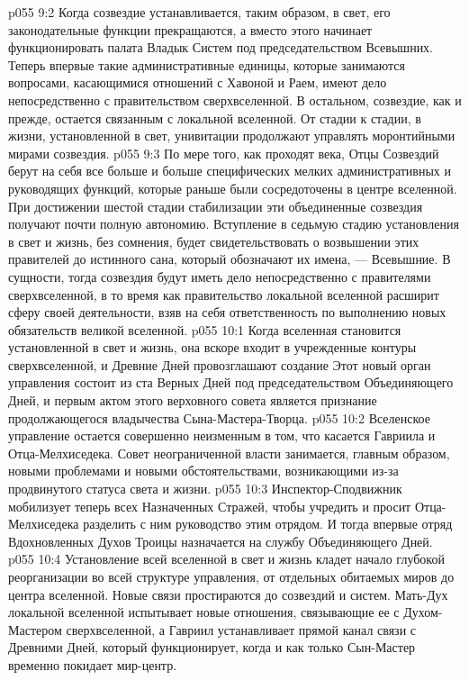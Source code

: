 \vs p055 9:2 Когда созвездие устанавливается, таким образом, в свет, его законодательные функции прекращаются, а вместо этого начинает функционировать палата Владык Систем под председательством Всевышних. Теперь впервые такие административные единицы, которые занимаются вопросами, касающимися отношений с Хавоной и Раем, имеют дело непосредственно с правительством сверхвселенной. В остальном, созвездие, как и прежде, остается связанным с локальной вселенной. От стадии к стадии, в жизни, установленной в свет, унивитации продолжают управлять моронтийными мирами созвездия.
\vs p055 9:3 По мере того, как проходят века, Отцы Созвездий берут на себя все больше и больше специфических мелких административных и руководящих функций, которые раньше были сосредоточены в центре вселенной. При достижении шестой стадии стабилизации эти объединенные созвездия получают почти полную автономию. Вступление в седьмую стадию установления в свет и жизнь, без сомнения, будет свидетельствовать о возвышении этих правителей до истинного сана, который обозначают их имена, --- Всевышние. В сущности, тогда созвездия будут иметь дело непосредственно с правителями сверхвселенной, в то время как правительство локальной вселенной расширит сферу своей деятельности, взяв на себя ответственность по выполнению новых обязательств великой вселенной.
\vs p055 10:1 Когда вселенная становится установленной в свет и жизнь, она вскоре входит в учрежденные контуры сверхвселенной, и Древние Дней провозглашают создание  Этот новый орган управления состоит из ста Верных Дней под председательством Объединяющего Дней, и первым актом этого верховного совета является признание продолжающегося владычества Сына\hyp{}Мастера\hyp{}Творца.
\vs p055 10:2 Вселенское управление остается совершенно неизменным в том, что касается Гавриила и Отца\hyp{}Мелхиседека. Совет неограниченной власти занимается, главным образом, новыми проблемами и новыми обстоятельствами, возникающими из\hyp{}за продвинутого статуса света и жизни.
\vs p055 10:3 \pc Инспектор\hyp{}Сподвижник мобилизует теперь всех Назначенных Стражей, чтобы учредить  и просит Отца\hyp{}Мелхиседека разделить с ним руководство этим отрядом. И тогда впервые отряд Вдохновленных Духов Троицы назначается на службу Объединяющего Дней.
\vs p055 10:4 \pc Установление всей вселенной в свет и жизнь кладет начало глубокой реорганизации во всей структуре управления, от отдельных обитаемых миров до центра вселенной. Новые связи простираются до созвездий и систем. Мать\hyp{}Дух локальной вселенной испытывает новые отношения, связывающие ее с Духом\hyp{}Мастером сверхвселенной, а Гавриил устанавливает прямой канал связи с Древними Дней, который функционирует, когда и как только Сын\hyp{}Мастер временно покидает мир\hyp{}центр.
